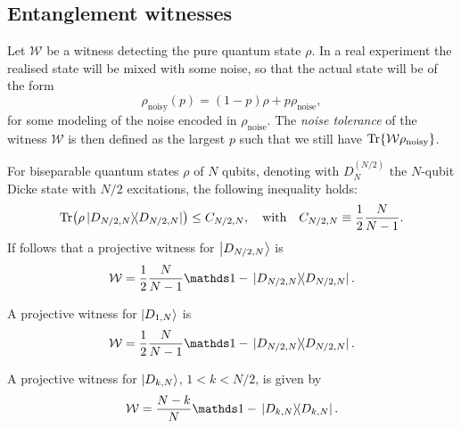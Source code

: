 \documentclass[12pt]{report}
\begin{document}
\subsection{Entanglement witnesses}

\begin{defn}
	Let $\mathcal W$ be a witness detecting the pure quantum state $\rho$.
	In a real experiment the realised state will be mixed with some noise, so that the actual state will be of the form
	\begin{equation}
		\rho_{\text{noisy}}(p) = (1-p) \rho + p \rho_{\text{noise}},
	\end{equation}
	for some modeling of the noise encoded in $\rho_{\text{noise}}$.
	The \emph{noise tolerance} of the witness $\mathcal W$ is then defined as the largest $p$ such that we still have $\Tr{\mathcal W \rho_{\text{noisy}}}$.
\end{defn}

\begin{thm}
	
\end{thm}

\begin{thm}
	For biseparable quantum states $\rho$ of $N$ qubits,
	denoting with $D_N^{(N/2)}$ the $N$-qubit Dicke state with $N/2$ excitations,
	the following inequality holds:
	\begin{equation}
		\Tr(\rho \ketbra*{D_{N/2,N}}{D_{N/2,N}})
		\le C_{N/2, N},
		\quad\text{with}\quad
		C_{N/2,N} \equiv \frac{1}{2}\frac{N}{N-1}.
	\end{equation}
	If follows that a projective witness for $\ket{D_{N/2,N}}$ is
	\begin{equation}
		\mathcal W = \frac{1}{2} \frac{N}{N - 1} \mathds 1 -
			\ketbra*{D_{N/2,N}}{D_{N/2,N}}.
	\end{equation}
\end{thm}

\begin{thm}
	A projective witness for $\ket{D_{1, N}}$ is
	\begin{equation}
		\mathcal W = \frac{1}{2} \frac{N}{N - 1} \mathds 1 -
			\ketbra*{D_{N/2,N}}{D_{N/2,N}}.
	\end{equation}
\end{thm}

\begin{thm}
	A projective witness for $\ket{D_{k, N}}$, $1 < k < N/2$, is given by
	\begin{equation}
		\mathcal W = \frac{N - k}{N} \mathds 1 - \ketbra*{D_{k,N}}{D_{k,N}}.
	\end{equation}
\end{thm}
\end{document}
